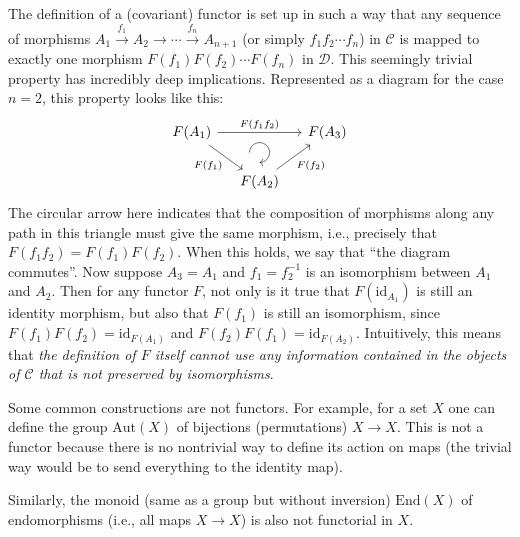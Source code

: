 The definition of a (covariant) functor is set up in such a way that any sequence of morphisms $A_1\overset{f_1}{\to}A_2\to\cdots\overset{f_n}\to A_{n+1}$ (or simply $f_1f_2\cdots f_n$) in $\mathcal{C}$ is mapped to exactly one morphism $F(f_1)F(f_2)\cdots F(f_n)$ in $\mathcal{D}$. This seemingly trivial property has incredibly deep implications. Represented as a diagram for the case $n=2$, this property looks like this:
\begin{equation}
    \begin{tikzcd}[column sep=small, every matrix/.append style={name=m},   
    execute at end picture={\draw [<-] ([xshift=0em,yshift=.5em]m-2-2.north) arc[start angle=-90,delta angle=270,radius=0.25cm];}]
    F(A_1) \arrow[rr, "F(f_1f_2)"] \arrow[dr, "F(f_1)", swap] & & F(A_3)\\
    & F(A_2)  \arrow[ru, "F(f_2)"'] & 
    \end{tikzcd}
\end{equation}
The circular arrow here indicates that the composition of morphisms along any path in this triangle must give the same morphism, i.e., precisely that $F(f_1f_2)=F(f_1)F(f_2)$. When this holds, we say that ``the diagram commutes''. Now suppose $A_3=A_1$ and $f_1=f_2^{-1}$ is an isomorphism between $A_1$ and $A_2$. Then for any functor $F$, not only is it true that $F(\mathrm{id}_{A_1})$ is still an identity morphism, but also that $F(f_1)$ is still an isomorphism, since $F(f_1)F(f_2)=\mathrm{id}_{F(A_1)}$ and $F(f_2)F(f_1)=\mathrm{id}_{F(A_2)}$. Intuitively, this means that \emph{the definition of $F$ itself cannot use any information contained in the objects of $\mathcal{C}$ that is not preserved by isomorphisms}. 

\begin{example}
    Some common constructions are not functors. For example, for a set $X$ one can define the group $\mathrm{Aut}(X)$ of bijections (permutations) $X\to X$. This is not a functor because there is no nontrivial way to define its action on maps (the trivial way would be to send everything to the identity map).

    Similarly, the monoid (same as a group but without inversion) $\mathrm{End}(X)$ of endomorphisms (i.e., all maps $X\to X$) is also not functorial in $X$.
\end{example}


